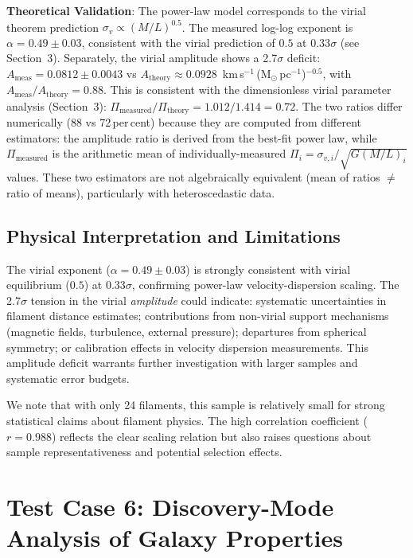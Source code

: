 \documentclass[usenatbib]{rasti}
\begin{document}
\textbf{Theoretical Validation}: The power-law model corresponds to the virial theorem prediction $\sigma_v \propto (M/L)^{0.5}$. The measured log-log exponent is $\alpha = 0.49 \pm 0.03$, consistent with the virial prediction of $0.5$ at $0.33\sigma$ (see Section~3). Separately, the virial amplitude shows a 2.7$\sigma$ deficit: $A_{\mathrm{meas}} = 0.0812 \pm 0.0043$ vs $A_{\mathrm{theory}} \approx 0.0928$~km\,s$^{-1}$\,(M$_{\odot}$\,pc$^{-1}$)$^{-0.5}$, with $A_{\mathrm{meas}}/A_{\mathrm{theory}} = 0.88$. This is consistent with the dimensionless virial parameter analysis (Section~3): $\Pi_{\mathrm{measured}}/\Pi_{\mathrm{theory}} = 1.012/1.414 = 0.72$. The two ratios differ numerically (88 vs 72\,per\,cent) because they are computed from different estimators: the amplitude ratio is derived from the best-fit power law, while $\Pi_{\mathrm{measured}}$ is the arithmetic mean of individually-measured $\Pi_i = \sigma_{v,i}/\sqrt{G(M/L)_i}$ values. These two estimators are not algebraically equivalent (mean of ratios $\neq$ ratio of means), particularly with heteroscedastic data.

\subsection{Physical Interpretation and Limitations}

The virial exponent ($\alpha = 0.49 \pm 0.03$) is strongly consistent with virial equilibrium ($0.5$) at $0.33\sigma$, confirming power-law velocity-dispersion scaling. The 2.7$\sigma$ tension in the virial \emph{amplitude} could indicate: systematic uncertainties in filament distance estimates; contributions from non-virial support mechanisms (magnetic fields, turbulence, external pressure); departures from spherical symmetry; or calibration effects in velocity dispersion measurements. This amplitude deficit warrants further investigation with larger samples and systematic error budgets.

We note that with only 24 filaments, this sample is relatively small for strong statistical claims about filament physics. The high correlation coefficient ($r = 0.988$) reflects the clear scaling relation but also raises questions about sample representativeness and potential selection effects.

\section{Test Case 6: Discovery-Mode Analysis of Galaxy Properties}
\end{document}
